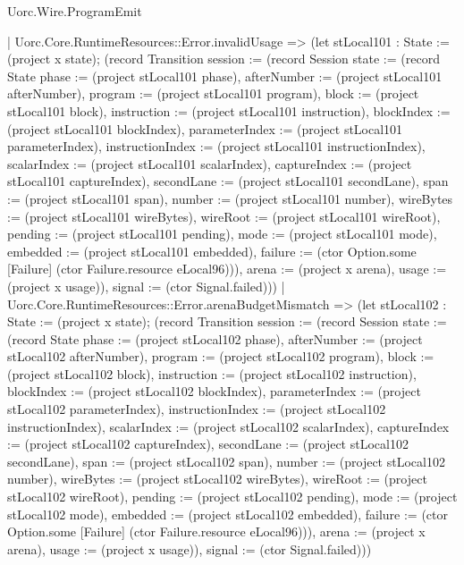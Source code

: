\begin{lexlean}{Uorc.Wire.ProgramEmit}
\begin{semanticmodule}
{      | Uorc.Core.RuntimeResources::Error.invalidUsage => (let stLocal101 : State := (project x state); (record Transition {session := (record Session {state := (record State {phase := (project stLocal101 phase), afterNumber := (project stLocal101 afterNumber), program := (project stLocal101 program), block := (project stLocal101 block), instruction := (project stLocal101 instruction), blockIndex := (project stLocal101 blockIndex), parameterIndex := (project stLocal101 parameterIndex), instructionIndex := (project stLocal101 instructionIndex), scalarIndex := (project stLocal101 scalarIndex), captureIndex := (project stLocal101 captureIndex), secondLane := (project stLocal101 secondLane), span := (project stLocal101 span), number := (project stLocal101 number), wireBytes := (project stLocal101 wireBytes), wireRoot := (project stLocal101 wireRoot), pending := (project stLocal101 pending), mode := (project stLocal101 mode), embedded := (project stLocal101 embedded), failure := (ctor Option.some [Failure] (ctor Failure.resource eLocal96))}), arena := (project x arena), usage := (project x usage)}), signal := (ctor Signal.failed)}))
      | Uorc.Core.RuntimeResources::Error.arenaBudgetMismatch => (let stLocal102 : State := (project x state); (record Transition {session := (record Session {state := (record State {phase := (project stLocal102 phase), afterNumber := (project stLocal102 afterNumber), program := (project stLocal102 program), block := (project stLocal102 block), instruction := (project stLocal102 instruction), blockIndex := (project stLocal102 blockIndex), parameterIndex := (project stLocal102 parameterIndex), instructionIndex := (project stLocal102 instructionIndex), scalarIndex := (project stLocal102 scalarIndex), captureIndex := (project stLocal102 captureIndex), secondLane := (project stLocal102 secondLane), span := (project stLocal102 span), number := (project stLocal102 number), wireBytes := (project stLocal102 wireBytes), wireRoot := (project stLocal102 wireRoot), pending := (project stLocal102 pending), mode := (project stLocal102 mode), embedded := (project stLocal102 embedded), failure := (ctor Option.some [Failure] (ctor Failure.resource eLocal96))}), arena := (project x arena), usage := (project x usage)}), signal := (ctor Signal.failed)}))
}
\end{semanticmodule}
\end{lexlean}
